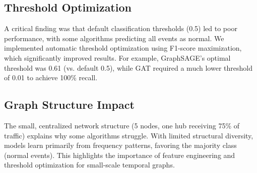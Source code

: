 \subsection{Threshold Optimization}

A critical finding was that default classification thresholds (0.5) led to poor performance, with some algorithms predicting all events as normal. We implemented automatic threshold optimization using F1-score maximization, which significantly improved results. For example, GraphSAGE's optimal threshold was 0.61 (vs. default 0.5), while GAT required a much lower threshold of 0.01 to achieve 100\% recall.

\subsection{Graph Structure Impact}

The small, centralized network structure (5 nodes, one hub receiving 75\% of traffic) explains why some algorithms struggle. With limited structural diversity, models learn primarily from frequency patterns, favoring the majority class (normal events). This highlights the importance of feature engineering and threshold optimization for small-scale temporal graphs.

